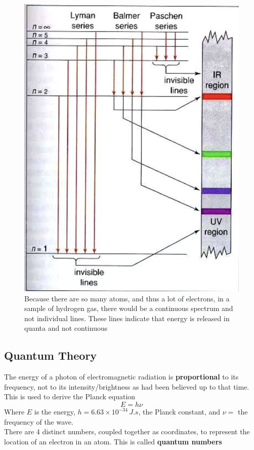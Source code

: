 \begin{figure}[ht!]
    \centering
    \includegraphics[width=0.6 \textwidth]{../figures/hydrogen-spectrum-lines.png}
    \caption{Because there are so many atoms, and thus a lot of electrons, in a sample of hydrogen 
            gas, there would be a continuous spectrum and not individual lines. These lines indicate
            that energy is released in quanta and not continuous}
    \label{fig:hydrogen-spectrum-lines}
\end{figure}

\subsection{Quantum Theory}
The energy of a photon of electromagnetic radiation is \textbf{proportional} to its frequency,
not to its intensity/brightness as had been believed up to that time. This is used to derive
the Planck equation
\[
    E=h\nu
\]
Where $E$ is the energy, $h=6.63\times10^{-34}\,\si{J.s}$, the Planck constant, and $\nu=$ the
frequency of the wave.\\

There are 4 distinct numbers, coupled together as coordinates, to represent the location of
an electron in an atom. This is called \textbf{quantum numbers}

